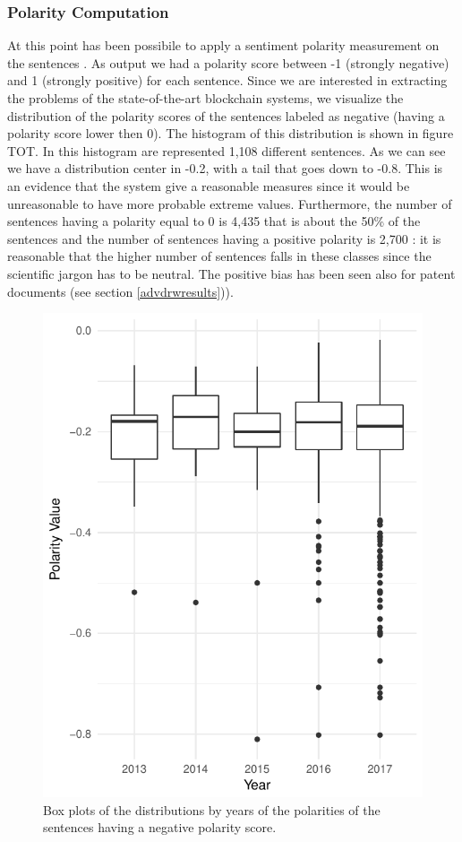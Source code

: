 \documentclass[]{book}
\begin{document}
\subsubsection*{Polarity Computation}\label{polarity-computation}

At this point has been possibile to apply a sentiment polarity
measurement on the sentences \citep{sentimentr2018}. As output we had a
polarity score between -1 (strongly negative) and 1 (strongly positive)
for each sentence. Since we are interested in extracting the problems of
the state-of-the-art blockchain systems, we visualize the distribution
of the polarity scores of the sentences labeled as negative (having a
polarity score lower then 0). The histogram of this distribution is
shown in figure TOT. In this histogram are represented 1,108 different
sentences. As we can see we have a distribution center in -0.2, with a
tail that goes down to -0.8. This is an evidence that the system give a
reasonable measures since it would be unreasonable to have more probable
extreme values. Furthermore, the number of sentences having a polarity
equal to 0 is 4,435 that is about the 50\% of the sentences and the
number of sentences having a positive polarity is 2,700 : it is
reasonable that the higher number of sentences falls in these classes
since the scientific jargon has to be neutral. The positive bias has
been seen also for patent documents (see section \ref{advdrwresults})).

\begin{figure}

{\centering \includegraphics[width=0.5\linewidth]{_bookdown_files/figures/polarity_histogram_time_bl} 

}

\caption{Box plots of the distributions  by years of the polarities of the sentences having a negative polarity score.}\label{fig:sentintimebl}
\end{figure}
\end{document}
